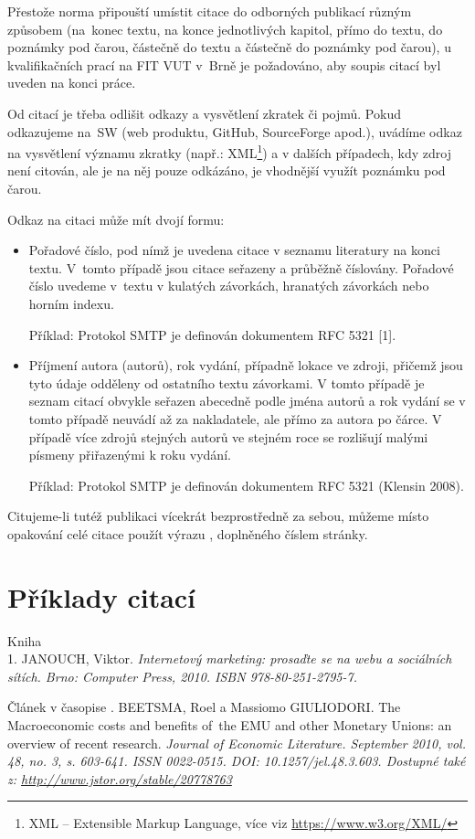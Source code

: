Přestože norma připouští umístit citace do odborných publikací různým způsobem (na~konec textu, na konce jednotlivých kapitol, přímo do textu, do poznámky pod čarou, částečně do textu a částečně do poznámky pod čarou), u kvalifikačních prací na FIT VUT v~Brně je požadováno, aby soupis citací byl uveden na konci práce.

Od citací je třeba odlišit odkazy a vysvětlení zkratek či pojmů. Pokud odkazujeme na~SW (web produktu, GitHub, SourceForge apod.), uvádíme odkaz na vysvětlení významu zkratky (např.: XML\footnote{XML -- Extensible Markup Language, více viz \url{https://www.w3.org/XML/}}) a v dalších případech, kdy zdroj není citován, ale je na něj pouze odkázáno, je vhodnější využít poznámku pod čarou.

Odkaz na citaci může mít dvojí formu:
\begin{itemize}
  \item{Pořadové číslo, pod nímž je uvedena citace v seznamu literatury na konci textu. V~tomto případě jsou citace seřazeny a průběžně číslovány. Pořadové číslo uvedeme v~textu v kulatých závorkách, hranatých závorkách nebo horním indexu.

  Příklad: Protokol SMTP je definován dokumentem RFC 5321 [1].}
  \item{Příjmení autora (autorů), rok vydání, případně lokace ve zdroji, přičemž jsou tyto údaje odděleny od ostatního textu závorkami. V tomto případě je seznam citací obvykle seřazen abecedně podle jména autorů a rok vydání se v tomto případě neuvádí až za nakladatele, ale přímo za autora po čárce. V případě více zdrojů stejných autorů ve stejném roce se rozlišují malými písmeny přiřazenými k roku vydání.

  Příklad: Protokol SMTP je definován dokumentem RFC 5321 (Klensin 2008).}
\end{itemize}

Citujeme-li tutéž publikaci vícekrát bezprostředně za sebou, můžeme místo opakování celé citace použít výrazu , doplněného číslem stránky.

\section{Příklady citací}

Kniha \\
1. JANOUCH, Viktor. \it Internetový marketing: prosaďte se na webu a sociálních sítích\rm . Brno: Computer Press, 2010. ISBN 978-80-251-2795-7.

\bigskip
\noindent Článek v časopise . BEETSMA, Roel a Massiomo GIULIODORI. The Macroeconomic costs and benefits of~the EMU and other Monetary Unions: an overview of recent research. \it Journal of Economic Literature\rm . September 2010, vol. 48, no. 3, s. 603-641. ISSN 0022-0515. DOI: 10.1257/\linebreak[4]jel.48.3.603. Dostupné také z: \url{http://www.jstor.org/stable/20778763}

